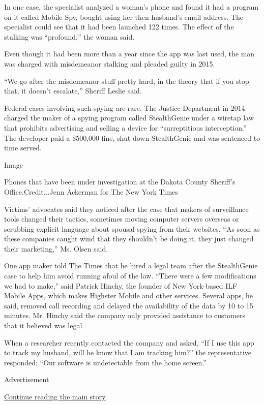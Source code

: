 In one case, the specialist analyzed a woman's phone and found it had a
program on it called Mobile Spy, bought using her then-husband's email
address. The specialist could see that it had been launched 122 times.
The effect of the stalking was ``profound,'' the woman said.

Even though it had been more than a year since the app was last used,
the man was charged with misdemeanor stalking and pleaded guilty in
2015.

``We go after the misdemeanor stuff pretty hard, in the theory that if
you stop that, it doesn't escalate,'' Sheriff Leslie said.

Federal cases involving such spying are rare. The Justice Department in
2014 charged the maker of a spying program called StealthGenie under a
wiretap law that prohibits advertising and selling a device for
``surreptitious interception.'' The developer paid a \$500,000 fine,
shut down StealthGenie and was sentenced to time served.

Image

Phones that have been under investigation at the Dakota County Sheriff's
Office.Credit...Jenn Ackerman for The New York Times

Victims' advocates said they noticed after the case that makers of
surveillance tools changed their tactics, sometimes moving computer
servers overseas or scrubbing explicit language about spousal spying
from their websites. ``As soon as these companies caught wind that they
shouldn't be doing it, they just changed their marketing,'' Ms. Olsen
said.

One app maker told The Times that he hired a legal team after the
StealthGenie case to help him avoid running afoul of the law. ``There
were a few modifications we had to make,'' said Patrick Hinchy, the
founder of New York-based ILF Mobile Apps, which makes Highster Mobile
and other services. Several apps, he said, removed call recording and
delayed the availability of the data by 10 to 15 minutes. Mr. Hinchy
said the company only provided assistance to customers that it believed
was legal.

When a researcher recently contacted the company and asked, ``If I use
this app to track my husband, will he know that I am tracking him?'' the
representative responded: ``Our software is undetectable from the home
screen.''

Advertisement

\protect\hyperlink{after-bottom}{Continue reading the main story}

